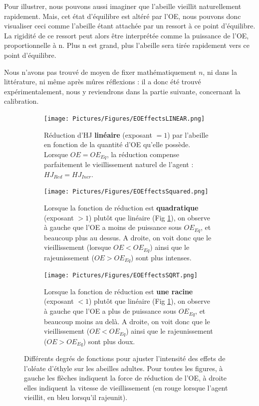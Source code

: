	Pour illustrer, nous pouvons aussi imaginer que l'abeille vieillit naturellement rapidement. Mais, cet état d'équilibre est altéré par l'OE, nous pouvons donc visualiser ceci comme l'abeille étant attachée par un ressort à ce point d'équilibre. La rigidité de ce ressort peut alors être interprétée comme la puissance de l'OE, proportionnelle à n. Plus n est grand, plus l'abeille sera tirée rapidement vers ce point d'équilibre.
	
	Nous n'avons pas trouvé de moyen de fixer mathématiquement $n$, ni dans la littérature, ni même après mûres réflexions : il a donc été trouvé expérimentalement, nous y reviendrons dans la partie suivante, concernant la calibration.
	
	\begin{figure}
	\centering
	
	\begin{subfigure}{\textwidth}
	\centering
	\texttt{[image: Pictures/Figures/EOEffectsLINEAR.png]}
	\caption{Réduction d'HJ \textbf{linéaire} (exposant $= 1$) par l'abeille en fonction de la quantité d'OE qu'elle possède. Lorsque $OE = OE_{Eq}$, la réduction compense parfaitement le vieillissement naturel de l'agent : $HJ_{Red} = HJ_{Incr}$.}
	\label{eoLinear}
	\end{subfigure}
	
	\begin{subfigure}{\textwidth}
	\centering
	\texttt{[image: Pictures/Figures/EOEffectsSquared.png]}
	\caption{Lorsque la fonction de réduction est \textbf{quadratique} (exposant $> 1$) plutôt que linéaire (Fig \ref{eoLinear}), on observe à gauche que l'OE a moins de puissance sous $OE_{Eq}$, et beaucoup plus au dessus. A droite, on voit donc que le vieillissement (lorsque $OE < OE_{Eq}$) ainsi que le rajeunissement ($OE > OE_{Eq}$) sont plus intenses.}
	\label{eoSquared}
	\end{subfigure}
	
	\begin{subfigure}{\textwidth}
	\centering
	\texttt{[image: Pictures/Figures/EOEffectsSQRT.png]}
	\caption{Lorsque la fonction de réduction est \textbf{une racine} (exposant $< 1$) plutôt que linéaire (Fig \ref{eoLinear}), on observe à gauche que l'OE a plus de puissance sous $OE_{Eq}$, et beaucoup moins au delà. A droite, on voit donc que le vieillissement ($OE < OE_{Eq}$) ainsi que le rajeunissement ($OE > OE_{Eq}$) sont plus doux.}
	\label{eoSqrt}	
	\end{subfigure}
	
	\caption[Différents degrés de fonctions pour ajuster l'intensité des effets de l'oléate d'éthyle sur les abeilles adultes.]{Différents degrés de fonctions pour ajuster l'intensité des effets de l'oléate d'éthyle sur les abeilles adultes. Pour toutes les figures, à gauche les flèches indiquent la force de réduction de l'OE, à droite elles indiquent la vitesse de vieillissement (en rouge lorsque l'agent vieillit, en bleu lorsqu'il rajeunit).}	
	\label{eoAll}
	\end{figure}
	
